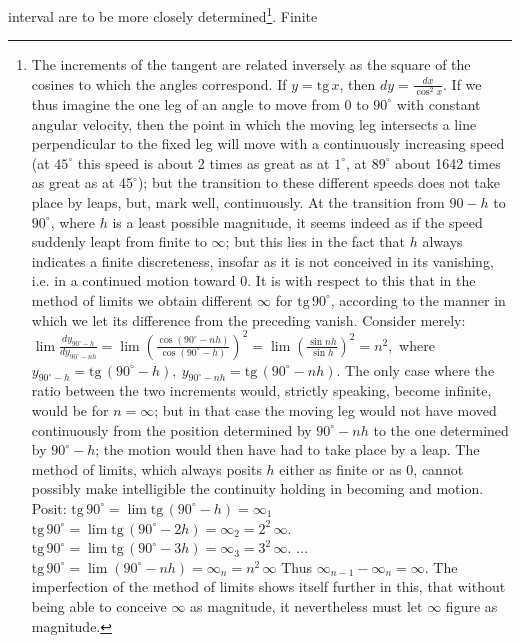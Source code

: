 \documentclass[12pt,a4paper,openany]{book}
\begin{document}
interval are to be more closely determined\footnote{The increments of the tangent are related inversely as the square
of the cosines to which the angles correspond. If $y = \mathrm{tg}\,x$, then
$dy = \frac{dx}{\cos^{2} x}$. If we thus imagine the one leg of an angle to move from 0 to $90^{\circ}$ with constant angular velocity, then the
point in which the moving leg intersects a line perpendicular to the fixed leg
will move with a continuously increasing
speed (at $45^{\circ}$ this speed is about 2 times as great
as at $1^{\circ}$, at $89^{\circ}$ about 1642 times as great as at $45^{\circ}$);
but the transition to these different speeds does not take place by
leaps, but, mark well, continuously. At the transition from
$90 - h$ to $90^{\circ}$, where $h$ is a least possible magnitude, it seems
indeed as if the speed suddenly leapt from finite to $\infty$; but
this lies in the fact that $h$ always indicates a finite discreteness,
insofar as it is not conceived in its vanishing, i.e. in a continued
motion toward $0$. It is with respect to this that in the method of limits we obtain different $\infty$ for $\mathrm{tg}\,90^{\circ}$, according to the manner
in which we let its difference from the preceding vanish.
Consider merely:
$\lim \frac{dy_{90^{\circ}-h}}{dy_{90^{\circ}-nh}} = \lim \left(\frac{\cos (90^{\circ}-nh)}{\cos (90^{\circ}-h)}\right)^{2} = \lim \left(\frac{\sin nh}{\sin h}\right)^{2} = n^{2},$
where
$y_{90^{\circ}-h} = \mathrm{tg}\,(90^{\circ}-h),\ y_{90^{\circ}-nh} = \mathrm{tg}\,(90^{\circ}-nh).$
The only case where the ratio between the two increments
would, strictly speaking, become infinite, would be for $n = \infty$;
but in that case the moving leg would not have moved
continuously from the position determined by $90^{\circ} - nh$ to the one determined by $90^{\circ} - h$;
the motion would then have had to take place by a leap.
The method of limits, which always posits $h$ either as finite or as
$0$, cannot possibly make intelligible the continuity holding in becoming and motion. Posit:
$\mathrm{tg}\,90^{\circ} = \lim \mathrm{tg}\,(90^{\circ} - h) = \infty_{1}$
$\mathrm{tg}\,90^{\circ} = \lim \mathrm{tg}\,(90^{\circ} - 2h) = \infty_{2} = 2^{2}\,\infty.$
$\mathrm{tg}\,90^{\circ} = \lim \mathrm{tg}\,(90^{\circ} - 3h) = \infty_{3} = 3^{2}\,\infty.$
$\dots$
$\mathrm{tg}\,90^{\circ} = \lim (90^{\circ} - nh) = \infty_{n} = n^{2}\,\infty$
Thus $\infty_{n-1} - \infty_{n} = \infty.$
The imperfection of the method of limits shows itself further in this,
that without being able to conceive $\infty$ as magnitude, it nevertheless must
let $\infty$ figure as magnitude.}. Finite
\end{document}

